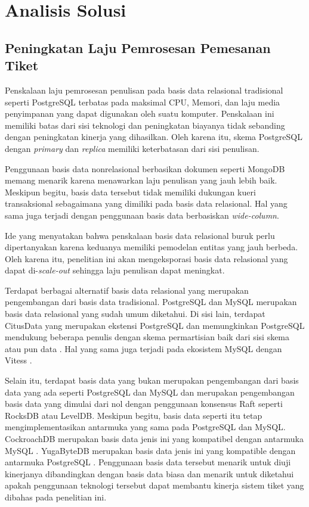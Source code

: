 \section{Analisis Solusi}

\subsection{Peningkatan Laju Pemrosesan Pemesanan Tiket}

Penskalaan laju pemrosesan penulisan pada basis data relasional tradisional seperti PostgreSQL terbatas pada maksimal CPU, Memori, dan laju media penyimpanan yang dapat digunakan oleh suatu komputer. Penskalaan ini memiliki batas dari sisi teknologi dan peningkatan biayanya tidak sebanding dengan peningkatan kinerja yang dihasilkan. Oleh karena itu, skema PostgreSQL dengan \textit{primary} dan \textit{replica} memiliki keterbatasan dari sisi penulisan.

Penggunaan basis data nonrelasional berbasikan dokumen seperti MongoDB memang menarik karena menawarkan laju penulisan yang jauh lebih baik. Meskipun begitu, basis data tersebut tidak memiliki dukungan kueri transaksional sebagaimana yang dimiliki pada basis data relasional. Hal yang sama juga terjadi dengan penggunaan basis data berbasiskan \textit{wide-column}.

Ide yang menyatakan bahwa penskalaan basis data relasional buruk perlu dipertanyakan karena keduanya memiliki pemodelan entitas yang jauh berbeda. Oleh karena itu, penelitian ini akan mengeksporasi basis data relasional yang dapat di-\textit{scale-out} sehingga laju penulisan dapat meningkat.

Terdapat berbagai alternatif basis data relasional yang merupakan pengembangan dari basis data tradisional. PostgreSQL dan MySQL merupakan basis data relasional yang sudah umum diketahui. Di sisi lain, terdapat CitusData yang merupakan ekstensi PostgreSQL dan memungkinkan PostgreSQL mendukung beberapa penulis dengan skema permartisian baik dari sisi skema atau pun data \parencite{citus}. Hal yang sama juga terjadi pada ekosistem MySQL dengan Vitess \parencite{vitess}.

Selain itu, terdapat basis data yang bukan merupakan pengembangan dari basis data yang ada seperti PostgreSQL dan MySQL dan merupakan pengembangan basis data yang dimulai dari nol dengan penggunaan konsensus Raft seperti RocksDB atau LevelDB. Meskipun begitu, basis data seperti itu tetap mengimplementasikan antarmuka yang sama pada PostgreSQL dan MySQL. CockroachDB merupakan basis data jenis ini yang kompatibel dengan antarmuka MySQL \parencite{cockroachDB}. YugaByteDB merupakan basis data jenis ini yang kompatible dengan antarmuka PostgreSQL \parencite{yugabyte}. Penggunaan basis data tersebut menarik untuk diuji kinerjanya dibandingkan dengan basis data biasa dan menarik untuk diketahui apakah penggunaan teknologi tersebut dapat membantu kinerja sistem tiket yang dibahas pada penelitian ini.

